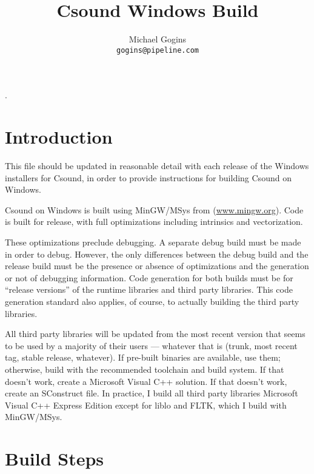 \documentclass[11pt,letterpaper,onecolumn]{scrartcl}
\begin{document}
\begin{sloppypar}

.
\title{Csound Windows Build}
\author{Michael Gogins \\ \texttt{gogins@pipeline.com}}
\maketitle

\section{Introduction}
\label{sec:Introduction}

This file should be updated in reasonable detail with each release of the Windows installers for Csound, in order to provide instructions for building Csound on Windows.

Csound on Windows is built using MinGW/MSys from (\url{www.mingw.org}). Code is built for release, with full optimizations including intrinsics and vectorization.  

These optimizations preclude debugging. A separate debug build must be made in order to debug. However, the only differences between the debug build and the release build must be the presence or absence of optimizations and the generation or not of debugging information. Code generation for both builds must be for ``release versions'' of the runtime libraries and third party libraries. This code generation standard also applies, of course, to actually building the third party libraries.

All third party libraries will be updated from the most recent version that seems to be used by a majority of their users --- whatever that is (trunk, most recent tag, stable release, whatever). If pre-built binaries are available, use them; otherwise, build with the recommended toolchain and build system. If that doesn't work, create a Microsoft Visual C++ solution. If that doesn't work, create an SConstruct file. In practice, I build all third party libraries Microsoft Visual C++ Express Edition except for liblo and FLTK, which I build with MinGW/MSys.

\section{Build Steps}
\label{sec:BuildSteps}


\end{sloppypar}
\end{document}
